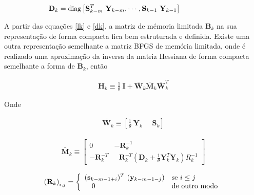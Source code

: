       \begin{eqnarray}
          \mathbf{D}_{k} = \hbox{diag} \left [ \mathbf{S}_{k-m}^{T}~ \mathbf{Y}_{k-m}, \cdots, \mathbf{S}_{k-1}~ \mathbf{Y}_{k-1} \right ] ~~~~ ~~~~ ~~~~~~~~
          \label{dk}
       \end{eqnarray}



       A partir das equações \ref{lk} e \ref{dk}, a matriz de mémoria limitada $\mathbf{B}_{k}$ na sua representação de forma compacta fica bem estruturada e definida. Existe uma outra representação semelhante a matriz BFGS de memória limitada, onde é realizado uma aproximação da inversa da matriz Hessiana de forma compacta semelhante a forma de $\mathbf{B}_{k}$, então
       
       \begin{eqnarray}
       \mathbf{H}_{k} \equiv \frac{1}{\theta}~ \mathbf{I} + \bar{\mathbf{W}}_{k} \bar{\mathbf{M}}_{k} \bar{\mathbf{W}}_{k}^{T}  
       \end{eqnarray}
       
       Onde 
       
       \begin{eqnarray}
        \nonumber
        \bar{\mathbf{W}}_{k} \equiv \left [ \frac{1}{\theta}~ \mathbf{Y}_{k} ~~~~~~ \mathbf{S}_{k} \right ]
       \end{eqnarray}

      \begin{eqnarray}
      \nonumber
      \bar{\mathbf{M}}_{k} \equiv\left[\begin{array}{cc}{0} & {-\mathbf{R}_{k}^{-1}} \\ {-\mathbf{R}_{k}^{-T}} &~~~ {\mathbf{R}_{k}^{-T}\left(\mathbf{D}_{k}+\frac{1}{\theta} \mathbf{Y}_{k}^{T} \mathbf{Y}_{k}\right) R_{k}^{-1}}\end{array}\right]
      \end{eqnarray}
      
          \begin{eqnarray} 
          \nonumber
          \left(\mathbf{R}_{k} \right)_{i,j}  = \left\{ \begin{array}{rll}
          (\mathbf{s}_{k-m-1+i})^{T}~(\mathbf{y}_{k-m-1-j})  & \hbox{se}~ i \le j \\
          0 ~~~~~~ ~                 ~~~~~~~~ ~~~~~~~~~ ~~~~~& \hbox{de outro modo}
          \end{array} \right.
          \label{lk1}
          \end{eqnarray}
          
